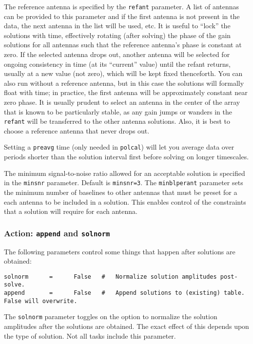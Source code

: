 The reference antenna is specified by the {\tt refant} parameter. A
list of antennas can be provided to this parameter and if the first
antenna is not present in the data, the next antenna in the list will
be used, etc.  It is useful to ``lock'' the solutions with time,
effectively rotating (after solving) the phase of the gain solutions
for all antennas such that the reference antenna's phase is constant
at zero.  If the selected antenna drops out, another antenna will be
selected for ongoing consistency in time (at its ``current'' value)
until the refant returns, usually at a new value (not zero), which
will be kept fixed thenceforth.  You can also run without a reference
antenna, but in this case the solutions will formally float with time;
in practice, the first antenna will be approximately constant near
zero phase.  It is usually prudent to select an antenna in the center
of the array that is known to be particularly stable, as any gain
jumps or wanders in the {\tt refant} will be transferred to the other
antenna solutions.  Also, it is best to choose a reference antenna
that never drops out.



Setting a {\tt preavg} time (only needed in {\tt polcal}) will let you
average data over periods shorter than the solution interval first
before solving on longer timescales.

The minimum signal-to-noise ratio allowed for an acceptable solution
is specified in the {\tt minsnr} parameter.  Default is {\tt minsnr=3}.
The {\tt minblperant} parameter sets the minimum number of baselines
to other antennas that must be preset for a each antenna to be
included in a solution.  This enables control of the constraints
that a solution will require for each antenna.

\subsubsection{Action: {\tt append} and {\tt solnorm} }
\label{section:cal.solve.pars.action}

The following parameters control some things that happen after
solutions are obtained:
\small
\begin{verbatim}
solnorm      =      False   #   Normalize solution amplitudes post-solve.
append       =      False   #   Append solutions to (existing) table.  False will overwrite.
\end{verbatim} 
\normalsize

The {\tt solnorm} parameter toggles on the option to normalize the
solution amplitudes after the solutions are obtained.  The exact
effect of this depends upon the type of solution.  Not all tasks
include this parameter.  

